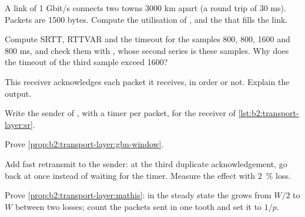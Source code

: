 \begin{exercise}[$\star$]\label{exo:b2:transport-layer:4}
A link of 1 Gbit/s connects two towns 3000 km apart (a round trip of 30 ms). Packets are 1500 bytes. Compute the
utilisation of , and the  that fills the link.
\end{exercise}

\begin{exercise}[$\star\star$]\label{exo:b2:transport-layer:5}
Compute SRTT, RTTVAR and the timeout for the samples 800, 800, 1600 and 800 ms, and check them with
, whose second series is these samples. Why does the timeout of the third sample exceed 1600?
\end{exercise}

\begin{exercise}[$\star\star$]\label{exo:b2:transport-layer:6}
This receiver acknowledges each packet it receives, in order or not. Explain the output.
\end{exercise}

\begin{exercise}[$\star\star$]\label{exo:b2:transport-layer:7}
Write the sender of , with a timer per packet, for the receiver of \cref{lst:b2:transport-layer:sr}.
\end{exercise}

\begin{exercise}[$\star\star$]\label{exo:b2:transport-layer:8}
Prove \cref{prop:b2:transport-layer:gbn-window}.
\end{exercise}

\begin{exercise}[$\star\star$]\label{exo:b2:transport-layer:9}
Add fast retransmit to the  sender: at the third duplicate acknowledgement, go back at once instead of
waiting for the timer. Measure the effect with 2~\% loss.
\end{exercise}

\begin{exercise}[$\star\star\star$]\label{exo:b2:transport-layer:10}
Prove \cref{prop:b2:transport-layer:mathis}: in the steady state the  grows from $W/2$ to $W$ between two
losses; count the packets sent in one tooth and set it to $1/p$.
\end{exercise}

